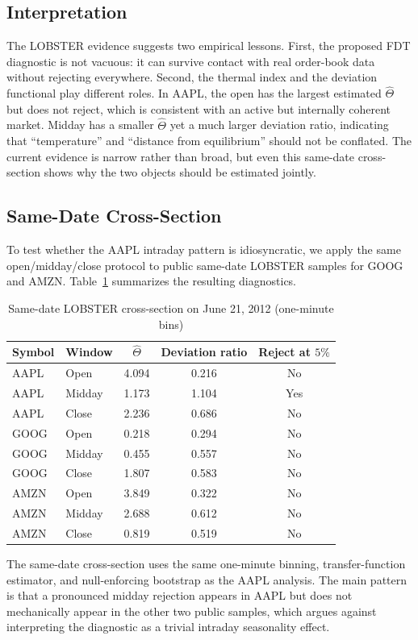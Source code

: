 \documentclass[11pt]{article}
\begin{document}
\subsection{Interpretation}
The LOBSTER evidence suggests two empirical lessons. First, the proposed FDT diagnostic is not vacuous: it can survive contact with real order-book data without rejecting everywhere. Second, the thermal index and the deviation functional play different roles. In AAPL, the open has the largest estimated $\widehat{\Theta}$ but does not reject, which is consistent with an active but internally coherent market. Midday has a smaller $\widehat{\Theta}$ yet a much larger deviation ratio, indicating that ``temperature'' and ``distance from equilibrium'' should not be conflated. The current evidence is narrow rather than broad, but even this same-date cross-section shows why the two objects should be estimated jointly.

\subsection{Same-Date Cross-Section}
To test whether the AAPL intraday pattern is idiosyncratic, we apply the same
open/midday/close protocol to public same-date LOBSTER samples for GOOG and
AMZN. Table~\ref{tab:lobster-cross-section} summarizes the resulting
diagnostics.

\begin{table}[H]
\centering
\caption{Same-date LOBSTER cross-section on June 21, 2012 (one-minute bins)}
\begin{tabular}{llccc}
\toprule
Symbol & Window & $\widehat{\Theta}$ & Deviation ratio & Reject at $5\%$ \\
\midrule
AAPL & Open   & 4.094 & 0.216 & No \\
AAPL & Midday & 1.173 & 1.104 & Yes \\
AAPL & Close  & 2.236 & 0.686 & No \\
GOOG & Open   & 0.218 & 0.294 & No \\
GOOG & Midday & 0.455 & 0.557 & No \\
GOOG & Close  & 1.807 & 0.583 & No \\
AMZN & Open   & 3.849 & 0.322 & No \\
AMZN & Midday & 2.688 & 0.612 & No \\
AMZN & Close  & 0.819 & 0.519 & No \\
\bottomrule
\end{tabular}
\vspace{0.4em}

\parbox{0.94\textwidth}{\footnotesize The same-date cross-section uses the same one-minute binning, transfer-function estimator, and null-enforcing bootstrap as the AAPL analysis. The main pattern is that a pronounced midday rejection appears in AAPL but does not mechanically appear in the other two public samples, which argues against interpreting the diagnostic as a trivial intraday seasonality effect.}
\label{tab:lobster-cross-section}
\end{table}
\end{document}
